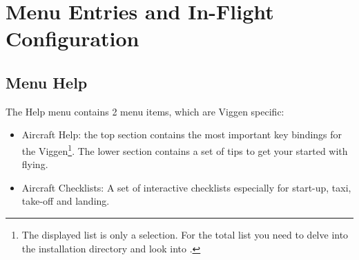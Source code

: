 \section{Menu Entries and In-Flight Configuration}
\subsection{Menu Help}
The Help menu contains 2 menu items, which are Viggen specific:
\begin{itemize}
\item Aircraft Help: the top section contains the most important key bindings for the Viggen\footnote{The displayed list is only a selection. For the total list you need to delve into the installation directory and look into .}. The lower section contains a set of tips to get your started with flying.
\item Aircraft Checklists: A set of interactive checklists especially for start-up, taxi, take-off and landing.
\end{itemize}

